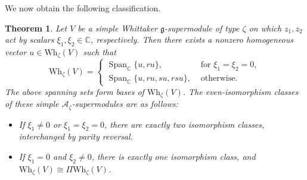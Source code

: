 \documentclass[a4paper,10pt]{article}
\theoremstyle{definition}
\theoremstyle{plain}
\newtheorem{theorem}[definition]{Theorem}
\theoremstyle{remark}
\theoremstyle{mystyle}
\numberwithin{equation}{section}
\begin{document}
We now obtain the following classification.
\begin{theorem}\label{Vphi}
    Let \(V\) be a simple Whittaker \(\mathfrak g\)-supermodule of type \(\zeta\) on which \(z_1,z_2\) act by scalars \(\xi_1,\xi_2\in\mathbb C\), respectively. Then there exists a nonzero homogeneous vector $u\in \mathrm{Wh}_{\zeta}(V)$ such that 
    \[
    \mathrm{Wh}_{\zeta}(V)=
    \begin{cases}
    \operatorname{Span}_{\mathbb C}\{u,ru\},
    &\text{ for }\xi_1=\xi_2=0,\\
    \operatorname{Span}_{\mathbb C}\{u,ru,su,rsu\},&\text{ otherwise}.
    \end{cases}
    \]
    The above spanning sets form bases of \(\mathrm{Wh}_{\zeta}(V)\). The even-isomorphism classes of these simple \(\mathcal A_\zeta\)-supermodules are as follows:
    \begin{itemize}
        \item[(1).] If \(\xi_1\neq0\) or $\xi_1=\xi_2=0$, there are exactly two isomorphism classes, interchanged by parity reversal.
        \item[(2).] If \(\xi_1=0\) and \(\xi_2\neq0\), there is exactly one isomorphism class, and \(\mathrm{Wh}_{\zeta}(V)\cong\Pi\mathrm{Wh}_{\zeta}(V)\).
    \end{itemize}
\end{theorem}
\end{document}
